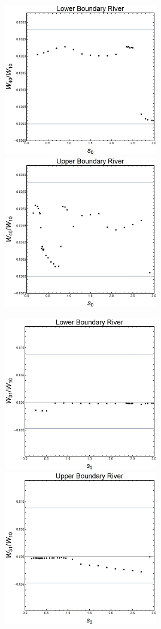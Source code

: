 ﻿\documentclass[12pt,a4paper]{article}
\begin{document}
\begin{figure}[H]
    \centering
   {{\includegraphics[width=6.7cm]{L40.jpg} }}
  {{\includegraphics[width=6.7cm]{U40.jpg} }}
\end{figure}

\begin{figure}[H]
    \centering
   {{\includegraphics[width=6.7cm]{L31.jpg} }}
  {{\includegraphics[width=6.7cm]{U31.jpg} }}
\end{figure}
\end{document}
